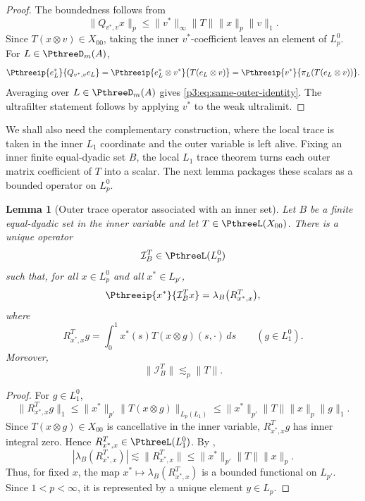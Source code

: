 \documentclass[11pt,reqno]{amsart}
\makeatletter
\theoremstyle{plain}
\newtheorem{lemma}[lemma]{Lemma}
\theoremstyle{definition}
\newcounter{problempaper}
\newenvironment{problempaperbody}{%
  \setcounter{subsection}{0}%
  \setcounter{subsubsection}{0}%
  \setcounter{paragraph}{0}%
  \renewcommand{\thesubsection}{\arabic{subsection}}%
  \renewcommand{\thesubsubsection}{\thesubsection.\arabic{subsubsection}}%
  \renewcommand{\theparagraph}{\thesubsubsection.\arabic{paragraph}}%
  \let\problem@outersection\section
  \let\problem@outersubsection\subsection
  \let\problem@outersubsubsection\subsubsection
  \let\problem@outerparagraph\paragraph
  \let\section\problem@papersection
  \let\subsection\problem@papersubsection
  \let\subsubsection\problem@papersubsubsection
}{%
  \let\section\problem@outersection
  \let\subsection\problem@outersubsection
  \let\subsubsection\problem@outersubsubsection
  \let\paragraph\problem@outerparagraph
}
\newcommand{\problem@target}[2]{%
  \hypertarget{problem-\theproblempaper-#1-#2}{}%
}
\newcommand{\problem@paperheading}[3]{%
  \par\bigskip
  \problem@target{#1}{#2}%
  \noindent{\large\bfseries #2.\quad #3\par}%
  \nobreak\smallskip
}
\newcommand{\problem@papersubheading}[3]{%
  \par\medskip
  \problem@target{#1}{#2}%
  \noindent{\normalsize\bfseries #2.\quad #3\par}%
  \nobreak\smallskip
}
\newcommand{\problem@papersubsubheading}[3]{%
  \par\smallskip
  \problem@target{#1}{#2}%
  \noindent{\normalsize\itshape #2.\quad #3.\ }%
}
\def\problem@papersection{%
  \@ifstar{\problem@papersectionstar}{\problem@papersectionnostar}%
}
\def\problem@papersectionstar#1{%
  \par\bigskip\noindent{\large\bfseries #1\par}\nobreak\smallskip
}
\def\problem@papersectionnostar#1{%
  \refstepcounter{subsection}%
  \setcounter{subsubsection}{0}%
  \setcounter{paragraph}{0}%
  \problem@paperheading{section}{\thesubsection}{#1}%
  \problem@writecontentsline{section}{\thesubsection}{#1}%
}
\def\problem@papersubsection{%
  \@ifstar{\problem@papersubsectionstar}{\problem@papersubsectionnostar}%
}
\def\problem@papersubsectionstar#1{%
  \par\medskip\noindent{\normalsize\bfseries #1\par}\nobreak\smallskip
}
\def\problem@papersubsectionnostar#1{%
  \refstepcounter{subsubsection}%
  \setcounter{paragraph}{0}%
  \problem@papersubheading{subsection}{\thesubsubsection}{#1}%
  \problem@writecontentsline{subsection}{\thesubsubsection}{#1}%
}
\def\problem@papersubsubsection{%
  \@ifstar{\problem@papersubsubsectionstar}{\problem@papersubsubsectionnostar}%
}
\def\problem@papersubsubsectionstar#1{%
  \par\smallskip\noindent{\normalsize\itshape #1.\ }%
}
\def\problem@papersubsubsectionnostar#1{%
  \refstepcounter{paragraph}%
  \problem@papersubsubheading{subsubsection}{\theparagraph}{#1}%
  \problem@writecontentsline{subsubsection}{\theparagraph}{#1}%
}
\newcommand{\problem@writecontentsline}[3]{%
  \begingroup
  \protected@write\@auxout{}{%
    \string\problemcontentsentry{\theproblempaper}{#1}{#2}{#3}{\thepage}%
  }%
  \endgroup
}
\newcommand{\problemcontentsentry}[5]{%
  \@ifundefined{problemcontents@#1}{%
    \expandafter\gdef\csname problemcontents@#1\endcsname{}%
  }{}%
  \expandafter\g@addto@macro\csname problemcontents@#1\endcsname{%
    \problemcontentsline{#1}{#2}{#3}{#4}{#5}%
  }%
}
\newcommand{\problemcontentslink}[4]{%
  \hyperlink{problem-#1-#2-#3}{#4}%
}
\newcommand{\problemcontentsline}[5]{%
  \ifstrequal{#2}{section}{%
    \par\noindent
    \problemcontentslink{#1}{#2}{#3}{\makebox[2.5em][l]{#3}#4}%
    \nobreak\dotfill
    \problemcontentslink{#1}{#2}{#3}{#5}\par
  }{%
    \ifstrequal{#2}{subsection}{%
      \par\noindent\hspace*{1.5em}%
      \problemcontentslink{#1}{#2}{#3}{\makebox[3.5em][l]{#3}#4}%
      \nobreak\dotfill
      \problemcontentslink{#1}{#2}{#3}{#5}\par
    }{%
      \par\noindent\hspace*{3em}%
      \problemcontentslink{#1}{#2}{#3}{\makebox[4.5em][l]{#3}#4}%
      \nobreak\dotfill
      \problemcontentslink{#1}{#2}{#3}{#5}\par
    }%
  }%
}
\makeatother
\begin{document}
\begin{problempaperbody}
\begin{proof}
The boundedness follows from
\begin{equation*}
        \|Q_{v^*,v}x\|_p
        \leq
        \|v^*\|_\infty\|T\|\|x\|_p\|v\|_1 .
\end{equation*}
Since $T(x\otimes v)\in X_{00}$, taking the inner $v^*$-coefficient leaves an element of $L_p^0$. For $L\in\PthreeD_m(A)$,
\begin{equation*}
        \Pthreeip{e_L^*}{Q_{v^*,v}e_L} = \Pthreeip{e_L^*\otimes v^*}{T(e_L\otimes v)} = \Pthreeip{v^*}{\pi_L(T(e_L\otimes v))}.
\end{equation*}
Averaging over $L\in\PthreeD_m(A)$ gives \eqref{p3:eq:same-outer-identity}. The ultrafilter statement follows by applying $v^*$ to the weak ultralimit.
\end{proof}

We shall also need the complementary construction, where the local trace is taken in the inner $L_1$ coordinate and the outer variable is left alive. Fixing an inner finite equal-dyadic set $B$, the local $L_1$ trace theorem turns each outer matrix coefficient of $T$ into a scalar. The next lemma packages these scalars as a bounded operator on $L_p^0$.

\begin{lemma}[Outer trace operator associated with an inner set]
\label{p3:lem:inner-set-outer-trace-operator}
Let $B$ be a finite equal-dyadic set in the inner variable and let $T\in\PthreeL(X_{00})$. There is a unique operator
\begin{equation*}
        \mathcal I_B^T\in\PthreeL(L_p^0)
\end{equation*}
such that, for all $x\in L_p^0$ and all $x^*\in L_{p'}$,
\begin{equation}
\label{p3:eq:definition-of-IBT}
        \Pthreeip{x^*}{\mathcal I_B^Tx}=\lambda_B\bigl(R_{x^*,x}^T\bigr),
\end{equation}
where
\begin{equation*}
        R_{x^*,x}^Tg=\int_0^1 x^*(s)T(x\otimes g)(s,\cdot)\,ds\qquad(g\in L_1^0).
\end{equation*}
Moreover,
\begin{equation*}
        \|\mathcal I_B^T\|\lesssim_p\|T\|.
\end{equation*}
\end{lemma}

\begin{proof}
For $g\in L_1^0$,
\begin{equation*}
        \|R_{x^*,x}^Tg\|_1\leq\|x^*\|_{p'}\|T(x\otimes g)\|_{L_p(L_1)}\leq\|x^*\|_{p'}\|T\|\|x\|_p\|g\|_1.
\end{equation*}
Since $T(x\otimes g)\in X_{00}$ is cancellative in the inner variable, $R_{x^*,x}^Tg$ has inner integral zero. Hence $R_{x^*,x}^T\in\PthreeL(L_1^0)$. By ,
\begin{equation*}
        |\lambda_B(R_{x^*,x}^T)|\lesssim\|R_{x^*,x}^T\|\leq\|x^*\|_{p'}\|T\|\|x\|_p.
\end{equation*}
Thus, for fixed $x$, the map $x^*\mapsto\lambda_B(R_{x^*,x}^T)$ is a bounded functional on $L_{p'}$. Since $1<p<\infty$, it is represented by a unique element $y\in L_p$.


\end{proof}
\end{problempaperbody}
\end{document}
